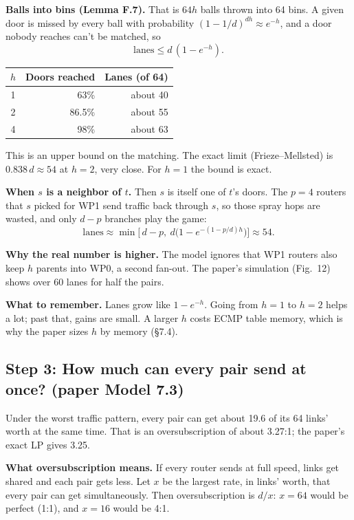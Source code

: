 \textbf{Balls into bins (Lemma F.7).} That is $64 h$ balls thrown into 64 bins. A given door is missed by every ball with probability $(1 - 1/d)^{d h} \approx e^{-h}$, and a door nobody reaches can't be matched, so
\[
\text{lanes} \le d\,(1 - e^{-h}).
\]

\begin{center}
\begin{tabular}{@{}crr@{}}
\toprule
$h$ & Doors reached & Lanes (of 64) \\
\midrule
1 & 63\% & about 40 \\
2 & 86.5\% & about 55 \\
4 & 98\% & about 63 \\
\bottomrule
\end{tabular}
\end{center}

This is an upper bound on the matching. The exact limit (Frieze--Mellsted) is $0.838\,d \approx 54$ at $h = 2$, very close. For $h = 1$ the bound is exact.

\textbf{When $s$ is a neighbor of $t$.} Then $s$ is itself one of $t$'s doors. The $p = 4$ routers that $s$ picked for WP1 send traffic back through $s$, so those spray hops are wasted, and only $d - p$ branches play the game:
\[
\text{lanes} \approx \min\!\Big[\, d - p,\ d \big(1 - e^{-(1 - p/d) h}\big) \Big] \approx 54.
\]

\textbf{Why the real number is higher.} The model ignores that WP1 routers also keep $h$ parents into WP0, a second fan-out. The paper's simulation (Fig.~12) shows over 60 lanes for half the pairs.

\textbf{What to remember.} Lanes grow like $1 - e^{-h}$. Going from $h = 1$ to $h = 2$ helps a lot; past that, gains are small. A larger $h$ costs ECMP table memory, which is why the paper sizes $h$ by memory (§7.4).

\subsection{Step 3: How much can every pair send at once? (paper Model 7.3)}

Under the worst traffic pattern, every pair can get about 19.6 of its 64 links' worth at the same time. That is an oversubscription of about 3.27:1; the paper's exact LP gives 3.25.

\textbf{What oversubscription means.} If every router sends at full speed, links get shared and each pair gets less. Let $x$ be the largest rate, in links' worth, that every pair can get simultaneously. Then oversubscription is $d / x$: $x = 64$ would be perfect (1:1), and $x = 16$ would be 4:1.


